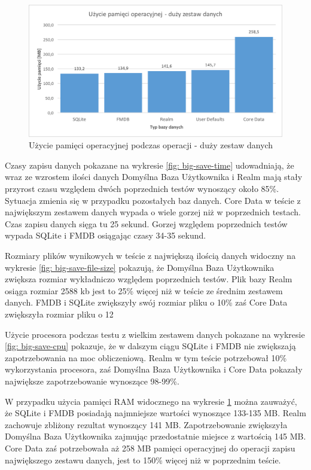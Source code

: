 \begin{figure}[H]
\centering
	\includegraphics[width=15cm]{img/save_data/save_ram_big.png}
	\caption{Użycie pamięci operacyjnej podczas operacji - duży zestaw danych}
	\label{fig: big-save-ram}
\end{figure}

\newpage

Czasy zapisu danych pokazane na wykresie \ref{fig: big-save-time} udowadniają, że wraz ze wzrostem ilości danych Domyślna Baza Użytkownika i Realm mają stały przyrost czasu względem dwóch poprzednich testów wynoszący około 85\%. Sytuacja zmienia się w przypadku pozostałych baz danych. Core Data w teście z największym zestawem danych wypada o wiele gorzej niż w poprzednich testach. Czas zapisu danych sięga tu 25 sekund. Gorzej względem poprzednich testów wypada SQLite i FMDB osiągając czasy 34-35 sekund. 

Rozmiary plików wynikowych w teście z największą ilością danych widoczny na wykresie \ref{fig: big-save-file-size} pokazują, że Domyślna Baza Użytkownika zwiększa rozmiar wykładniczo względem poprzednich testów. Plik bazy Realm osiąga rozmiar 2588 kb jest to 25\% więcej niż w teście ze średnim zestawem danych. FMDB i SQLite zwiększyły swój rozmiar pliku o 10\% zaś Core Data zwiększyła rozmiar pliku o 12%

Użycie procesora podczas testu z wielkim zestawem danych pokazane na wykresie \ref{fig: big-save-cpu} pokazuje, że w dalszym ciągu SQLite i FMDB nie zwiększają zapotrzebowania na moc obliczeniową. Realm w tym teście potrzebował 10\% wykorzystania procesora, zaś Domyślna Baza Użytkownika i Core Data pokazały największe zapotrzebowanie wynoszące 98-99\%. 

W przypadku użycia pamięci RAM widocznego na wykresie \ref{fig: big-save-ram} można zauważyć, że SQLite i FMDB posiadają najmniejsze wartości wynoszące 133-135 MB. Realm zachowuje zbliżony rezultat wynoszący 141 MB. Zapotrzebowanie zwiększyła Domyślna Baza Użytkownika zajmując przedostatnie miejsce z wartością 145 MB. Core Data zaś potrzebowała aż 258 MB pamięci operacyjnej do operacji zapisu największego zestawu danych, jest to 150\% więcej niż w poprzednim teście. 

